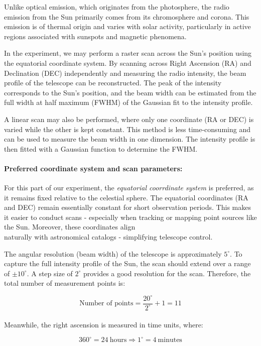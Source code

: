 \documentclass[12pt,a4paper]{article}
\begin{document}
Unlike optical emission, which originates from the photosphere, the radio emission from the Sun primarily comes from its chromosphere and corona. This emission is of thermal origin and varies with solar activity, particularly in active regions associated with sunspots and magnetic phenomena.

In the experiment, we may perform a raster scan across the Sun's position using the equatorial coordinate system. By scanning across Right Ascension (RA) and Declination (DEC) independently and measuring the radio intensity, the beam profile of the telescope can be reconstructed. The peak of the intensity corresponds to the Sun's position, and the beam width can be estimated from the full width at half maximum (FWHM) of the Gaussian fit to the intensity profile. 

A linear scan may also be performed, where only one coordinate (RA or DEC) is varied while the other is kept constant. This method is less time-consuming and can be used to measure the beam width in one dimension. The intensity profile is then fitted with a Gaussian function to determine the FWHM.

\paragraph{\textbf{Preferred coordinate system and scan parameters:}}
For this part of our experiment, the \textit{equatorial coorrdinate system} is preferred, as it remains fixed relative to the celestial sphere. The equatorial coordinates (RA and DEC) remain essentially constant for short observation periods. This makes it easier to conduct scans - especially when tracking or mapping point sources like the Sun. Moreover, these coordinates align \\ naturally with astronomical catalogs - simplifying telescope control.

The angular resolution (beam width) of the telescope is approximately \( 5^\circ \). To capture the full intensity profile of the Sun, the scan should extend over a range of \( \pm 10^\circ \). A step size of \( 2^\circ \) provides a good resolution for the scan. Therefore, the total number of measurement points is:

\[
\text{Number of points} = \frac{20^\circ}{2^\circ} + 1 = 11
\]
\\ Meanwhile, the right ascension is measured in time units, where:

\[
360^\circ = 24\ \text{hours} \Rightarrow 1^\circ = 4\ \text{minutes}
\]
\end{document}
